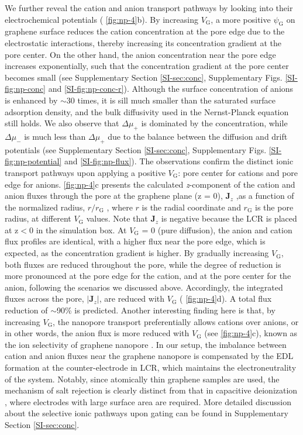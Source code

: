 We further reveal the cation and anion transport pathways by looking
into their electrochemical potentials ( \autoref{fig:np-4}b). By
increasing $V_{\mathrm{G}}$, a more positive $\psi_{\mathrm{G}}$ on
graphene surface reduces the cation concentration at the pore edge due
to the electrostatic interactions, thereby increasing its
concentration gradient at the pore center. On the other hand, the
anion concentration near the pore edge increases exponentially, such
that the concentration gradient at the pore center becomes small (see
{ Supplementary Section \autoref{SI-sec:conc}, Supplementary
Figs. \autoref{SI-fig:np-conc} and \autoref{SI-fig:np-conc-r}}).
{
Although the surface
concentration of anions is enhanced by $\sim{}$30 times, it is sill
much smaller than the saturated surface adsorption density, and the
bulk diffusivity used in the Nernst-Planck equation still holds.  We
also observe that $\Delta \mu_{+}$ is dominated by the concentration,
while $\Delta \mu_{-}$ is much less than $\Delta \mu_{+}$ due to the
balance between the diffusion and drift potentials (see Supplementary
Section \autoref{SI-sec:conc}, Supplementary Figs.  \autoref{SI-fig:np-potential}
and \autoref{SI-fig:np-flux})}. 
The observations confirm the distinct ionic
transport pathways upon applying a positive $V_{\mathrm{G}}$: pore
center for cations and pore edge for anions.  \autoref{fig:np-4}c
presents the calculated \textit{z}-component of the cation and anion
fluxes through the pore at the graphene plane (z = 0),
$\boldsymbol{J}_{z}$ ,as a function of the normalized radius,
$r/r_{\mathrm{G}}$ , where $r$ is the radial coordinate and
$r_{\mathrm{G}}$ is the pore radius, at different $V_{\mathrm{G}}$
values. Note that $\boldsymbol{J}_{z}$ is negative because the LCR is
placed at z$<$0 in the simulation box. At $V_{\mathrm{G}}$ = 0 (pure
diffusion), the anion and cation flux profiles are identical, with a
higher flux near the pore edge, which is expected, as the
concentration gradient is higher. By gradually increasing
$V_{\mathrm{G}}$, both fluxes are reduced throughout the pore, while
the degree of reduction is more pronounced at the pore edge for the
cation, and at the pore center for the anion, following the scenarios
we discussed above. Accordingly, the integrated fluxes across the
pore, $|\boldsymbol{J}_{z}|$, are reduced with $V_{\mathrm{G}}$
( \autoref{fig:np-4}d). A total flux reduction of $\sim$90\% is
predicted. Another interesting finding here is that, by increasing
$V_{\mathrm{G}}$, the nanopore transport preferentially allows cations
over anions, or in other words, the anion flux is more reduced with
$V_{\mathrm{G}}$ (see  \autoref{fig:np-4}c), known as the ion
selectivity of graphene nanopore \cite{Rollings_2016_gating}. In our setup,
the imbalance between cation and anion fluxes near the graphene
nanopore is compensated by the EDL formation at the counter-electrode
in LCR, which maintains the electroneutrality of the system. Notably,
since atomically thin graphene samples are used, the mechanism of salt
rejection is clearly distinct from that in capacitive deionization
\cite{Biesheuvel_2010_desalin_theory}, where electrodes with large surface area are
required. 
{
More detailed discussion about the selective ionic pathways
upon gating can be found in Supplementary Section \autoref{SI-sec:conc}.}


